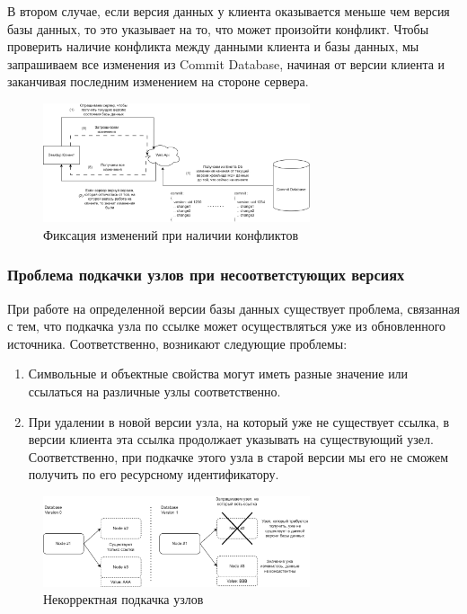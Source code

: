 \documentclass[12pt]{article}
\begin{document}
В втором случае, если версия данных у клиента оказывается меньше чем версия базы данных, то это указывает на то, что может произойти конфликт. Чтобы проверить наличие конфликта между данными клиента и базы данных, мы запрашиваем все изменения из Commit Database, начиная от версии клиента и заканчивая последним изменением на стороне сервера.

\begin{figure}[!ht]
    \centering
    \includegraphics[width=0.7\textwidth]{_images/if_merge_failure.png}
    \caption{Фиксация изменений при наличии конфликтов}
    \label{fig:if_merge_failure}
\end{figure}

\subsubsection{Проблема подкачки узлов при несоответстующих версиях}
\qquad При работе на определенной версии базы данных существует проблема, связанная с тем, что подкачка узла по ссылке может осуществляться уже из обновленного источника. Соответственно, возникают следующие проблемы:

\begin{enumerate}
    \item Символьные и объектные свойства могут иметь разные значение или ссылаться на различные узлы соответственно.
    \item При удалении в новой версии узла, на который уже не существует ссылка, в версии клиента эта ссылка продолжает указывать на существующий узел. Соответственно, при подкачке этого узла в старой версии мы его не сможем получить по его ресурсному идентификатору.
\end{enumerate}

\begin{figure}[!ht]
    \centering
    \includegraphics[width=0.7\textwidth]{_images/bad_node_pooling.png}
    \caption{Некорректная подкачка узлов}
\end{figure}
\end{document}

